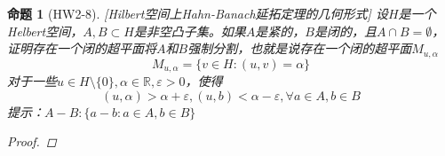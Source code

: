 \documentclass{article}                     %
\numberwithin{equation}{section}            %
\numberwithin{figure}{section}              %
\numberwithin{table}{section}               %
\newtheorem{proposition}[theorem]{\indent 命题}
\begin{document}
\begin{proposition}[HW2-8][Hilbert空间上Hahn-Banach延拓定理的几何形式]
    设$H$是一个Helbert空间，$A,B\subset H$是非空凸子集。如果$A$是紧的，$B$是闭的，且$A\cap B=\emptyset$，证明存在一个闭的超平面将$A$和$B$强制分割，也就是说存在一个闭的超平面$M_{u,\alpha}$
    $$M_{u,\alpha }=\{v\in H:(u,v)=\alpha\}$$
    对于一些$u\in H\setminus   \{0\},\alpha \in \mathbb{R} ,\varepsilon >0$，使得
    $$(u,\alpha)>\alpha +\varepsilon,(u,b)<\alpha -\varepsilon,\forall a\in A,b\in B$$
    提示：$A-B:\{a-b:a\in A,b\in B\}$
    \begin{proof}
        
    \end{proof}
\end{proposition}
\end{document}
